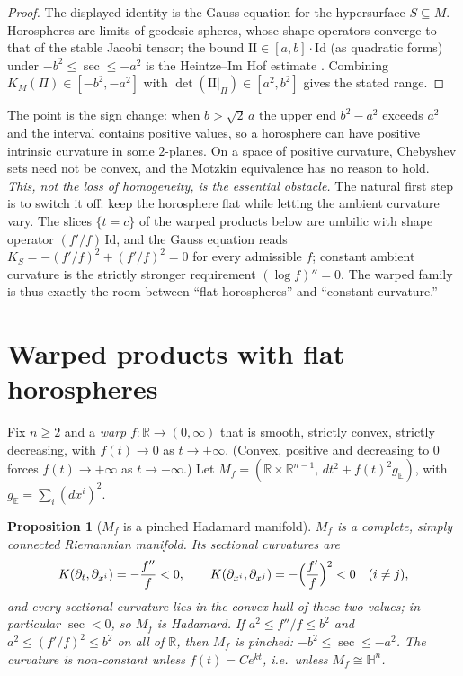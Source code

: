 \documentclass[11pt]{article}
\newtheorem{proposition}[theorem]{Proposition}
\theoremstyle{remark}
\newcommand{\R}{\mathbb{R}}
\newcommand{\Mf}{M_{f}}
\newcommand{\E}{\mathbb{E}}
\newcommand{\HH}{\mathbb{H}}
\begin{document}
\begin{proof}
The displayed identity is the Gauss equation for the hypersurface
$S\subseteq M$. Horospheres are limits of geodesic spheres, whose shape
operators converge to that of the stable Jacobi tensor; the bound
$\mathrm{II}\in[a,b]\cdot\mathrm{Id}$ (as quadratic forms) under
$-b^{2}\le\sec\le-a^{2}$ is the Heintze--Im Hof estimate \cite{HIH}.
Combining $K_{M}(\Pi)\in[-b^{2},-a^{2}]$ with
$\det(\mathrm{II}|_{\Pi})\in[a^{2},b^{2}]$ gives the stated range.
\end{proof}

The point is the sign change: when $b>\sqrt{2}\,a$ the upper end
$b^{2}-a^{2}$ exceeds $a^{2}$ and the interval contains positive
values, so a horosphere can have positive intrinsic curvature in some
$2$-planes. On a space of positive curvature, Chebyshev sets need not
be convex, and the Motzkin equivalence has no reason to hold.
\emph{This, not the loss of homogeneity, is the essential obstacle.}
The natural first step is to switch it off: keep the horosphere flat
while letting the ambient curvature vary. The slices $\{t=c\}$ of the
warped products below are umbilic with shape operator
$(f'/f)\,\mathrm{Id}$, and the Gauss equation reads
$K_{S}=-(f'/f)^{2}+(f'/f)^{2}=0$ for every admissible $f$; constant
ambient curvature is the strictly stronger requirement
$(\log f)''=0$. The warped family is thus exactly the room between
``flat horospheres'' and ``constant curvature.''

\section{Warped products with flat horospheres}\label{sec:warp}

Fix $n\ge2$ and a \emph{warp} $f:\R\to(0,\infty)$ that is smooth,
strictly convex, strictly decreasing, with $f(t)\to0$ as
$t\to+\infty$. (Convex, positive and decreasing to $0$ forces
$f(t)\to+\infty$ as $t\to-\infty$.) Let
$\Mf=(\R\times\R^{n-1},\,dt^{2}+f(t)^{2}g_{\E})$, with
$g_{\E}=\sum_{i}(dx^{i})^{2}$.

\begin{proposition}[$\Mf$ is a pinched Hadamard manifold]
\label{prop:mf-curv}
$\Mf$ is a complete, simply connected Riemannian manifold. Its
sectional curvatures are
\[
  K(\partial_{t},\partial_{x^{i}})=-\frac{f''}{f}<0,
  \qquad
  K(\partial_{x^{i}},\partial_{x^{j}})=-\Bigl(\frac{f'}{f}\Bigr)^{2}<0
  \quad(i\neq j),
\]
and every sectional curvature lies in the convex hull of these two
values; in particular $\sec<0$, so $\Mf$ is Hadamard. If
$a^{2}\le f''/f\le b^{2}$ and $a^{2}\le(f'/f)^{2}\le b^{2}$ on all of
$\R$, then $\Mf$ is pinched: $-b^{2}\le\sec\le-a^{2}$. The curvature is
non-constant unless $f(t)=Ce^{kt}$, i.e.\ unless $\Mf\cong\HH^{n}$.
\end{proposition}
\end{document}

